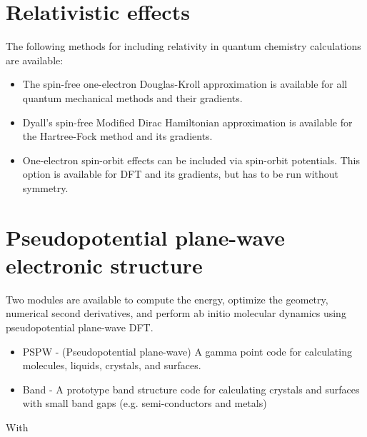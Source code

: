 \section{Relativistic effects}

The following methods for including relativity in quantum chemistry 
calculations are available:
\begin{itemize}
\item The spin-free one-electron Douglas-Kroll approximation is available for all 
 quantum mechanical methods and their gradients.
\item Dyall's spin-free Modified Dirac Hamiltonian approximation is available 
 for the Hartree-Fock method and its gradients.
\item One-electron spin-orbit effects can be included via spin-orbit potentials.
 This option is available for DFT and its gradients, but has to be run without 
 symmetry.
\end{itemize}

\section{Pseudopotential plane-wave electronic structure}

Two modules are available to compute the energy, optimize the
geometry, numerical second derivatives, and perform ab initio 
molecular dynamics using pseudopotential plane-wave DFT.

\begin{itemize}
\item PSPW - (Pseudopotential plane-wave) A gamma point code for calculating
molecules, liquids, crystals, and surfaces.
\item Band - A prototype band structure code for calculating crystals and 
surfaces with small band gaps (e.g. semi-conductors and metals)
\end{itemize}

With

